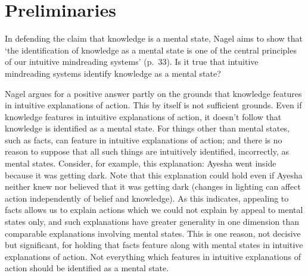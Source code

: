 \documentclass[11pt,a4paper]{extarticle}
\begin{document}
\setlength\footnotesep{1em}




\maketitle

\begin{abstract}
\noindent
***


\end{abstract}



\section{Preliminaries}
In defending the claim that knowledge is a mental state, Nagel aims to show that `the identification of knowledge as a mental state is one of the central principles of our intuitive mindreading systems' (p.\ 33).
Is it true that intuitive mindreading systems identify knowledge as a mental state?

Nagel argues for a positive answer
partly on the grounds that 
knowledge features in intuitive explanations of action.
This by itself is not sufficient grounds.
Even if knowledge features in intuitive explanations of action, 
it doesn't follow that
knowledge is identified as a mental state.
For things other than mental states, such as facts, can feature in intuitive explanations of action; and there is no reason to suppose that all such things are intuitively identified, incorrectly, as mental states.
Consider, for example, this explanation: Ayesha went inside because it was getting dark.
Note that this explanation could hold even if Ayesha neither knew nor believed that it was getting dark (changes in lighting can affect action independently of belief and knowledge).
As this indicates, appealing to facts allows us to explain actions which we could not explain by appeal to mental states only, and such explanations have greater generality in one dimension than comparable explanations involving mental states.
This is one reason, not decisive but significant, for holding that facts feature along with mental states in intuitive explanations of action.
Not everything which features in intuitive explanations of action should be identified as a mental state.
\end{document}

